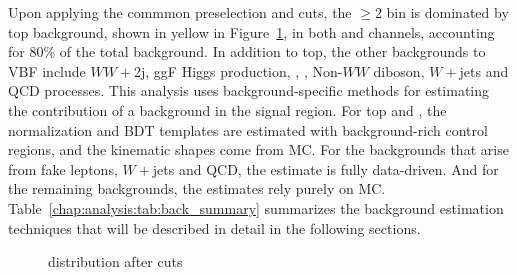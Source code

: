 
Upon applying the commmon preselection and \etmiss cuts, the \Njet$\geq{2}$ bin is
dominated by top background, shown in yellow in
Figure~\ref{chap:analysis:fig:n_jet}, in both \emme and \eemm
channels, accounting for 80\% of the
total background. In addition to top, the other backgrounds to VBF
include $WW+$2j, ggF Higgs production, \ZDYll, \Ztautau, Non-$WW$
diboson, $W+$jets and QCD processes. This analysis uses
background-specific methods for estimating the contribution of a
background in the signal region. For top and \ZDY, the normalization
and BDT templates are estimated with background-rich control regions,
and the kinematic shapes come from MC. For the backgrounds that arise
from fake leptons, $W+$jets and QCD, the estimate is fully
data-driven. And for the remaining backgrounds, the estimates rely
purely on MC. Table~\ref{chap:analysis:tab:back_summary} summarizes the background
estimation techniques that will be described in detail in the
following sections. 

\begin{figure}[h]
    \centering
    \caption[\Njet distribution after \etmiss cuts]{\Njet distribution
      after \etmiss cuts}
\label{chap:analysis:fig:n_jet}
\end{figure}

\begin{table}
\centering
\renewcommand{\arraystretch}{1.2}
\caption[Background summary.]{Backgrounds in the signal
region. Relative size in each flavor channel, as well as the
estimation method is shown.}
\label{chap:analysis:tab:back_summary}
\end{table}



